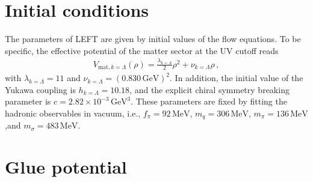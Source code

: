 \documentclass[%
reprint,
superscriptaddress,
showpacs,preprintnumbers,
amsmath,amssymb,
aps,
prd,
]{revtex4-1}
\begin{document}
	\section{Initial conditions}
	\label{app:Ini}
	
	The parameters of LEFT are given by initial values of the flow equations. To be specific, the effective potential of the matter sector at the UV cutoff reads
	\begin{align}
		V_{\mathrm{mat}, k=\Lambda}(\rho)=\frac{\lambda_{k=\Lambda}}{2}\rho^2+\nu_{k=\Lambda}\rho\,,
	\end{align}
	with $\lambda_{k=\Lambda}=11$ and $\nu_{k=\Lambda}=(0.830\,\mathrm{GeV})^2$. In addition, the initial value of the Yukawa coupling is $h_{k=\Lambda}=10.18$, and the explicit chiral symmetry breaking parameter is $c=2.82\times 10^{-3}\,\mathrm{GeV}^3$. These parameters are fixed by fitting the hadronic observables in vacuum, i.e., $f_\pi=92\,\mathrm{MeV}$, $m_q=306\,\mathrm{MeV}$, $m_\pi=136\,\mathrm{MeV}$,and $m_\sigma=483\,\mathrm{MeV}$.
	
	\section{Glue potential}
	\label{app:gluepot}
	
\end{document}
